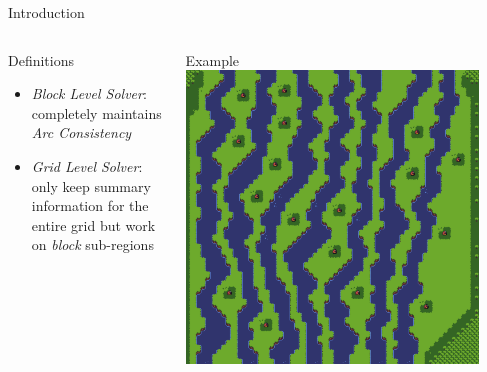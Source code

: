 \documentclass{beamer}
\begin{document}
  \begin{frame}[fragile]{Introduction}
    \begin{columns}[T,onlytextwidth]
        \begin{block}{Definitions}
          \hfill \\
          \begin{itemize}
            \item \textit{Block Level Solver}: \\
              completely maintains \textit{Arc Consistency}
            \item \textit{Grid Level Solver}: \\
              only keep summary information for the entire grid but
              work on \textit{block} sub-regions
          \end{itemize}
        \end{block}
        \begin{block}{Example}
          \includegraphics[width=0.9\textwidth]{img/forestmicro_64x64.pdf}
        \end{block}
    \end{columns}
  \end{frame}


  
\end{document}
